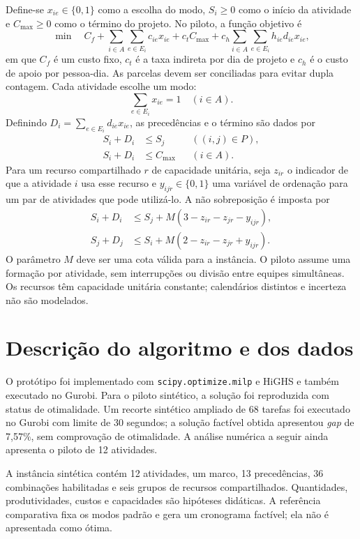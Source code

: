 \documentclass[12pt,a4paper]{article}
\begin{document}
Define-se $x_{ie}\in\{0,1\}$ como a escolha do modo, $S_i\geq0$ como o início da atividade e $C_{\max}\geq0$ como o término do projeto. No piloto, a função objetivo é
\begin{equation}
\min\quad C_f+\sum_{i\in A}\sum_{e\in E_i}c_{ie}x_{ie}
 +c_t C_{\max}+c_h\sum_{i\in A}\sum_{e\in E_i}h_{ie}d_{ie}x_{ie},
\end{equation}
em que $C_f$ é um custo fixo, $c_t$ é a taxa indireta por dia de projeto e $c_h$ é o custo de apoio por pessoa-dia. As parcelas devem ser conciliadas para evitar dupla contagem. Cada atividade escolhe um modo:
\begin{equation}
\sum_{e\in E_i}x_{ie}=1\quad (i\in A).
\end{equation}
Definindo $D_i=\sum_{e\in E_i}d_{ie}x_{ie}$, as precedências e o término são dados por
\begin{align}
S_i+D_i&\leq S_j &&((i,j)\in P),\\
S_i+D_i&\leq C_{\max} &&(i\in A).
\end{align}
Para um recurso compartilhado $r$ de capacidade unitária, seja $z_{ir}$ o indicador de que a atividade $i$ usa esse recurso e $y_{ijr}\in\{0,1\}$ uma variável de ordenação para um par de atividades que pode utilizá-lo. A não sobreposição é imposta por
\begin{align}
S_i+D_i&\leq S_j+M(3-z_{ir}-z_{jr}-y_{ijr}),\\
S_j+D_j&\leq S_i+M(2-z_{ir}-z_{jr}+y_{ijr}).
\end{align}
O parâmetro $M$ deve ser uma cota válida para a instância. O piloto assume uma formação por atividade, sem interrupções ou divisão entre equipes simultâneas. Os recursos têm capacidade unitária constante; calendários distintos e incerteza não são modelados.

\section{Descrição do algoritmo e dos dados}
O protótipo foi implementado com \texttt{scipy.optimize.milp} e HiGHS e também executado no Gurobi. Para o piloto sintético, a solução foi reproduzida com status de otimalidade. Um recorte sintético ampliado de 68 tarefas foi executado no Gurobi com limite de 30 segundos; a solução factível obtida apresentou \emph{gap} de 7,57\%, sem comprovação de otimalidade. A análise numérica a seguir ainda apresenta o piloto de 12 atividades.

A instância sintética contém 12 atividades, um marco, 13 precedências, 36 combinações habilitadas e seis grupos de recursos compartilhados. Quantidades, produtividades, custos e capacidades são hipóteses didáticas. A referência comparativa fixa os modos padrão e gera um cronograma factível; ela não é apresentada como ótima.
\end{document}
